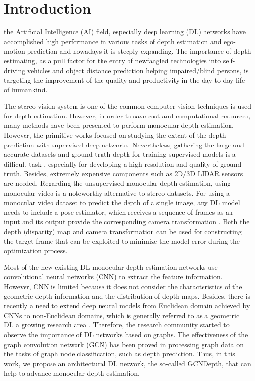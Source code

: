 \documentclass[journal]{IEEEtran}
\begin{document}
\section{Introduction}
 the Artificial Intelligence (AI) field, especially deep learning (DL) networks have accomplished high performance in various tasks of depth estimation and ego-motion prediction and nowadays it is steeply expanding. The importance of depth estimating, as a pull factor for the entry of newfangled technologies into self-driving vehicles \cite{Badue2017,Daily} and object distance prediction \cite{masoumian2021absolute} helping impaired/blind persons, is targeting the improvement of the quality and productivity in the day-to-day life of humankind. 

The stereo vision system is one of the common computer vision techniques is used for depth estimation. However, in order to save cost and computational resources, many methods have been presented to perform monocular depth estimation. However, the primitive works focused on studying the extent of the depth prediction with supervised deep networks. Nevertheless, gathering the large and accurate datasets and ground truth depth for training supervised models is a difficult task \cite{Eigen2014}, especially for developing a high resolution and quality of ground truth. Besides, extremely expensive components such as 2D/3D LIDAR sensors are needed. Regarding the unsupervised monocular depth estimation, using monocular video is a noteworthy alternative to stereo datasets. For using a monocular video dataset to predict the depth of a single image, any DL model needs to include a pose estimator, which receives a sequence of frames as an input and its output provide the corresponding camera transformation \cite{Godard2018}. Both the depth (disparity) map and camera transformation can be used for constructing the target frame that can be exploited to minimize the model error during the optimization process.

Most of the new existing DL monocular depth estimation networks use convolutional neural networks (CNN) to extract the feature information. However, CNN is limited because it does not consider the characteristics of the geometric depth information and the distribution of depth maps. Besides, there is recently a need to extend deep neural models from Euclidean domain achieved by CNNs to non-Euclidean domains, which is generally referred to as a geometric DL a growing research area \cite{Bronstein}. Therefore, the research community started to observe the importance of DL networks based on graphs. The effectiveness of the graph convolution network (GCN) has been proved in processing graph data on the tasks of graph node classification, such as depth prediction. Thus, in this work, we propose an architectural DL network, the so-called GCNDepth, that can help to advance monocular depth estimation. 
\end{document}
